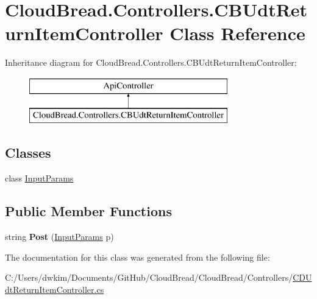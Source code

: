 \hypertarget{class_cloud_bread_1_1_controllers_1_1_c_b_udt_return_item_controller}{}\section{Cloud\+Bread.\+Controllers.\+C\+B\+Udt\+Return\+Item\+Controller Class Reference}
\label{class_cloud_bread_1_1_controllers_1_1_c_b_udt_return_item_controller}
Inheritance diagram for Cloud\+Bread.\+Controllers.\+C\+B\+Udt\+Return\+Item\+Controller\+:\begin{figure}[H]
\begin{center}
\leavevmode
\includegraphics[height=2.000000cm]{class_cloud_bread_1_1_controllers_1_1_c_b_udt_return_item_controller}
\end{center}
\end{figure}
\subsection*{Classes}
\begin{DoxyCompactItemize}
\item 
class \hyperlink{class_cloud_bread_1_1_controllers_1_1_c_b_udt_return_item_controller_1_1_input_params}{Input\+Params}
\end{DoxyCompactItemize}
\subsection*{Public Member Functions}
\begin{DoxyCompactItemize}
\item 
string {\bfseries Post} (\hyperlink{class_cloud_bread_1_1_controllers_1_1_c_b_udt_return_item_controller_1_1_input_params}{Input\+Params} p)\hypertarget{class_cloud_bread_1_1_controllers_1_1_c_b_udt_return_item_controller_a87a08b50ec73fd4f516a143dbd8e9ec0}{}\label{class_cloud_bread_1_1_controllers_1_1_c_b_udt_return_item_controller_a87a08b50ec73fd4f516a143dbd8e9ec0}

\end{DoxyCompactItemize}


The documentation for this class was generated from the following file\+:\begin{DoxyCompactItemize}
\item 
C\+:/\+Users/dwkim/\+Documents/\+Git\+Hub/\+Cloud\+Bread/\+Cloud\+Bread/\+Controllers/\hyperlink{_c_d_udt_return_item_controller_8cs}{C\+D\+Udt\+Return\+Item\+Controller.\+cs}\end{DoxyCompactItemize}
